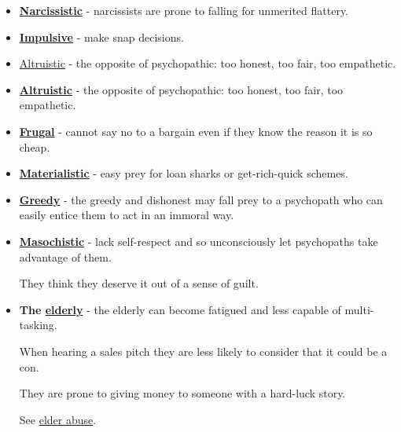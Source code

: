 \documentclass{book}
\numberwithin{equation}{section}
\begin{document}
\begin{itemize}
    A psychopathic stranger may offer human companionship for a price.
    \item \href{https://en.wikipedia.org/wiki/Narcissistic}{\textbf{Narcissistic}} - narcissists are prone to falling for unmerited flattery.
    \item \href{https://en.wikipedia.org/wiki/Impulsivity}{\textbf{Impulsive}} - make snap decisions.
    \item \href{https://en.wikipedia.org/wiki/Altruistic}{Altruistic} - the opposite of psychopathic: too honest, too fair, too empathetic.
    \item \href{https://en.wikipedia.org/wiki/Altruistic}{\textbf{Altruistic}} - the opposite of psychopathic: too honest, too fair, too empathetic.
    \item \href{https://en.wikipedia.org/wiki/Frugal}{\textbf{Frugal}} - cannot say no to a bargain even if they know the reason it is so cheap.
    \item \href{https://en.wikipedia.org/wiki/Materialistic}{\textbf{Materialistic}} - easy prey for loan sharks or get-rich-quick schemes.
    \item \href{https://en.wikipedia.org/wiki/Greed}{\textbf{Greedy}} - the greedy and dishonest may fall prey to a psychopath who can easily entice them to act in an immoral way.
    \item \href{https://en.wikipedia.org/wiki/Masochistic_personality_disorder}{\textbf{Masochistic}} - lack self-respect and so unconsciously let psychopaths take advantage of them.
    
    They think they deserve it out of a sense of guilt.
    \item \textbf{The \href{https://en.wikipedia.org/wiki/Elderly}{elderly}} - the elderly can become fatigued and less capable of multi-tasking.
    
    When hearing a sales pitch they are less likely to consider that it could be a con.
    
    They are prone to giving money to someone with a hard-luck story.
    
    See \href{https://en.wikipedia.org/wiki/Elder_abuse}{elder abuse}.
\end{itemize}
\end{document}
